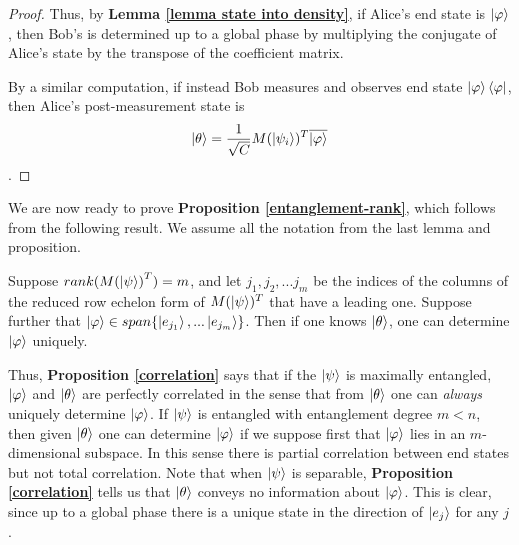 \begin{proof}
Thus, by {\bf{Lemma} \ref{lemma state into density}}, if Alice's end state is $\ket{\varphi}$, then Bob's is determined up to a global phase by multiplying the conjugate of Alice's state by the transpose of the coefficient matrix.


By a similar computation, if instead Bob measures and observes end state $\ket{\varphi}\bra{\varphi}$, then Alice's post-measurement state is $$\ket{\theta}=\frac{1}{\sqrt{C}} M(\ket{\psi_i})^T \overline{\ket{\varphi}}$$.
\end{proof}

\medskip
We are now ready to prove \textbf{Proposition \ref{entanglement-rank}}, which follows from the following result.  We assume all the notation from the last lemma and proposition.
\begin{prop}
\label{correlation}
Suppose $rank({M(\ket{\psi})}^T)=m$, and let $j_1, j_2, ... j_m$ be the indices of the columns of the reduced row echelon form of $M(\ket{\psi})^T$ that have a leading one.  Suppose further that $\ket{\varphi} \in span\{\ket{e_{j_1}}, ... \ket{e_{j_m}}\}$.  Then if one knows $\ket{\theta}$, one can determine $\ket{\varphi}$ uniquely.  
\end{prop}
Thus, {\bf{Proposition} \ref{correlation}} says that if the $\ket{\psi}$ is maximally entangled, $\ket{\varphi}$ and $\ket{\theta}$ are perfectly correlated in the sense that from $\ket{\theta}$ one can {\emph{always}} uniquely determine $\ket{\varphi}$.  If $\ket{\psi}$ is entangled with entanglement degree $m<n$, then given $\ket{\theta}$ one can determine $\ket{\varphi}$ if we suppose first that $\ket{\varphi}$ lies in an $m$-dimensional subspace.  In this sense there is partial correlation between end states but not total correlation.  Note that when $\ket{\psi}$ is separable, {\bf{Proposition} \ref{correlation}} tells us that $\ket{\theta}$ conveys no information about $\ket{\varphi}$.  This is clear, since up to a global phase there is a unique state in the direction of $\ket{e_j}$ for any $j$.

